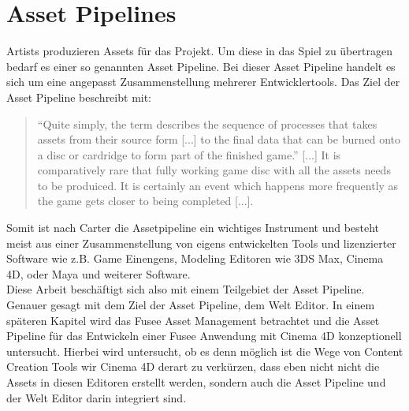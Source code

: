 \documentclass[pagesize, paper=a4, fontsize=12pt, titlepage=true, headings=small, headnosepline, abstractoff, liststotoc, nochapterprefix, plainheadsepline, twoside]{scrreprt}
\begin{document}
\section{Asset Pipelines}
Artists produzieren Assets für das Projekt. Um diese in das Spiel zu übertragen bedarf es einer so genannten Asset Pipeline. Bei dieser Asset Pipeline handelt es sich um eine angepasst Zusammenstellung mehrerer Entwicklertools. Das Ziel der Asset Pipeline beschreibt \autocite{Carter2004} mit:
\begin{quote}
“Quite simply, the term describes the sequence of processes that takes assets from their source form [...] to the final data that can be burned onto a disc or cardridge to form part of the finished game.”
[...]
It is comparatively rare that fully working game disc with all the assets needs to be produiced. It is certainly an event which happens more frequently as the game gets closer to being completed [...]. 
\end{quote}
Somit ist nach Carter die Assetpipeline ein wichtiges Instrument und besteht meist aus einer Zusammenstellung von eigens entwickelten Tools und lizenzierter Software wie z.B. Game Einengens, Modeling Editoren wie 3DS Max, Cinema 4D, oder Maya und weiterer Software.\\
Diese Arbeit beschäftigt sich also mit einem Teilgebiet der Asset Pipeline. Genauer gesagt mit dem Ziel der Asset Pipeline, dem Welt Editor. In einem späteren Kapitel wird das Fusee Asset Management betrachtet und die Asset Pipeline für das Entwickeln einer Fusee Anwendung mit Cinema 4D konzeptionell untersucht. Hierbei wird untersucht, ob es denn möglich ist die Wege von Content Creation Tools wir Cinema 4D derart zu verkürzen, dass eben nicht nicht die Assets in diesen Editoren erstellt werden, sondern auch die Asset Pipeline und der Welt Editor darin integriert sind.
\end{document}
